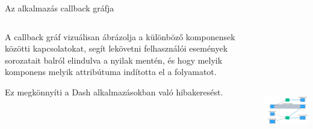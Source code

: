 \documentclass[english, aspectratio=169]{beamer}
\begin{document}
	\begin{frame}{Az alkalmazás callback gráfja}
		\begin{columns}
			\begin{column}{.5\textwidth}
				A callback gráf vizuálisan ábrázolja a különböző komponensek közötti kapcsolatokat, segít lekövetni felhasználói események sorozatait balról elindulva a nyilak mentén, és hogy melyik komponens melyik attribútuma indította el a folyamatot.\par\medskip 
				Ez megkönnyíti a Dash alkalmazásokban való hibakeresést. 
			\end{column}
			\begin{column}{.5\textwidth}
				\begin{center}
					\includegraphics[width=7cm, height=7cm, keepaspectratio]{images/freq_24.png}
				\end{center}
			\end{column}
		\end{columns}
	\end{frame}
\end{document}
